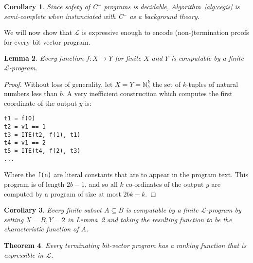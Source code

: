 \documentclass[preprint]{sigplanconf}
\newtheorem{theorem}{Theorem}
\newtheorem{lemma}[theorem]{Lemma}
\newtheorem{corollary}[theorem]{Corollary}
\theoremstyle{definition}
\newcommand{\newC}{C$^-$\xspace}
\begin{document}
\begin{corollary}
\label{cor:cegis-newc}
 Since safety of \newC programs is decidable, Algorithm~\ref{alg:cegis} is semi-complete
 when instanciated with \newC as a background theory.
\end{corollary}


% 

We will now show that $\mathcal{L}$ is expressive enough to encode (non-)termination proofs for
every bit-vector program.

\begin{lemma}
 \label{lem:l-func}
 Every function $f: X \to Y$ for finite $X$ and $Y$ is computable by a finite $\mathcal{L}$-program.
\end{lemma}

\begin{proof}
Without loss of generality, let $X = Y = \mathbb{N}_b^k$ the set of
$k$-tuples of natural numbers less than $b$.
A very inefficient construction which computes the first coordinate
of the output $y$ is:
%
\begin{verbatim}
t1 = f(0)
t2 = v1 == 1
t3 = ITE(t2, f(1), t1)
t4 = v1 == 2
t5 = ITE(t4, f(2), t3)
...
\end{verbatim}
%
Where the \verb|f(n)| are literal constants that are to appear in the program text.
This program is of length $2b - 1$, and so all $k$ co-ordinates of the output $y$
are computed by a program of size at most $2bk - k$.
\end{proof}

\begin{corollary}
 Every finite subset $A \subseteq B$ is computable by a finite $\mathcal{L}$-program
 by setting $X = B, Y = 2$ in Lemma~\ref{lem:l-func} and taking the
 resulting function to be the characteristic function of $A$.
\end{corollary}


\begin{theorem}
\label{thm:l-term}
 Every terminating bit-vector program has a ranking function that is expressible in $\mathcal{L}$.
\end{theorem}
\end{document}
